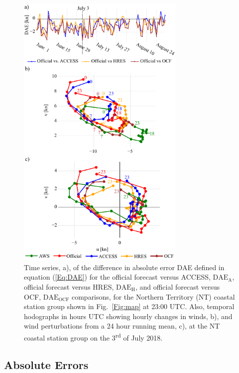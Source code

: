 \documentclass[twocol]{ametsoc}
\begin{document}
\begin{figure}
\centering
\includegraphics[width=19pc]{case_studies_nt.pdf}
\caption{Time series, a), of the difference in absolute error DAE defined in equation (\ref{Eq:DAE}) for the official forecast versus ACCESS, $\text{DAE}_\text{A}$, official forecast versus HRES, $\text{DAE}_\text{H}$, and official forecast versus OCF, $\text{DAE}_\text{OCF}$ comparisons, for the Northern Territory (NT) coastal station group shown in Fig.~\ref{Fig:map} at 23:00 UTC. Also, temporal hodographs in hours UTC showing hourly changes in winds, b), and wind perturbations from a 24 hour running mean, c), at the NT coastal station group on the 3\textsuperscript{rd} of July 2018.}
\label{Fig:case_studies_nt}
\end{figure}

\subsection{Absolute Errors}
\label{Sec:Daily}
\end{document}
